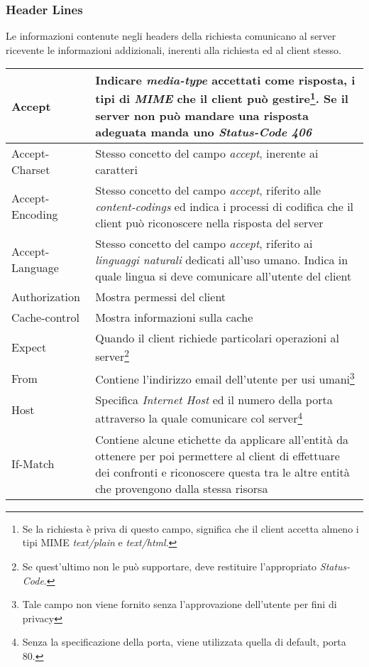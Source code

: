 \documentclass[a4paper,11pt]{article}
\begin{document}
\subsubsection{Header Lines}
Le informazioni contenute negli headers della richiesta comunicano al server ricevente le informazioni addizionali, inerenti alla richiesta ed al client stesso.\bigbreak
\begin{center}
    \begin{longtable}{l|p{}}  
        Accept & Indicare \textit{media-type} accettati come risposta, i tipi di \textit{MIME} che il client può gestire\footnote{Se la richiesta è priva di questo campo, significa che il client accetta almeno i tipi MIME \textit{text/plain} e \textit{text/html}.}. Se il server non può mandare una risposta adeguata manda uno \textit{Status-Code 406}\\
        \hline
        Accept-Charset & Stesso concetto del campo \textit{accept}, inerente ai caratteri\\
        \hline
        Accept-Encoding & Stesso concetto del campo \textit{accept}, riferito alle \textit{content-codings} ed indica i processi di codifica che il client può riconoscere nella risposta del server\\
        \hline
        Accept-Language & Stesso concetto del campo \textit{accept}, riferito ai \textit{linguaggi naturali} dedicati all’uso umano. Indica in quale lingua si deve comunicare all’utente del client\\
        \hline
        Authorization & Mostra permessi del client\\
        \hline
        Cache-control & Mostra informazioni sulla cache\\
        \hline
        Expect & Quando il client richiede particolari operazioni al server\footnote{Se quest’ultimo non le può supportare, deve restituire l'appropriato \textit{Status-Code}.}\\
        \hline
        From & Contiene l'indirizzo email dell’utente per usi umani\footnote{Tale campo non viene fornito senza l’approvazione dell’utente per fini di privacy}\\
        \hline
        Host & Specifica \textit{Internet Host} ed il numero della porta attraverso la quale comunicare col server\footnote{Senza la specificazione della porta, viene utilizzata quella di default, porta 80.}\\
        \hline
        If-Match & Contiene alcune etichette da applicare all’entità da ottenere per poi permettere al client di effettuare dei confronti e riconoscere questa tra le altre entità che provengono dalla stessa risorsa\\

\end{longtable}
\end{center}
\end{document}
